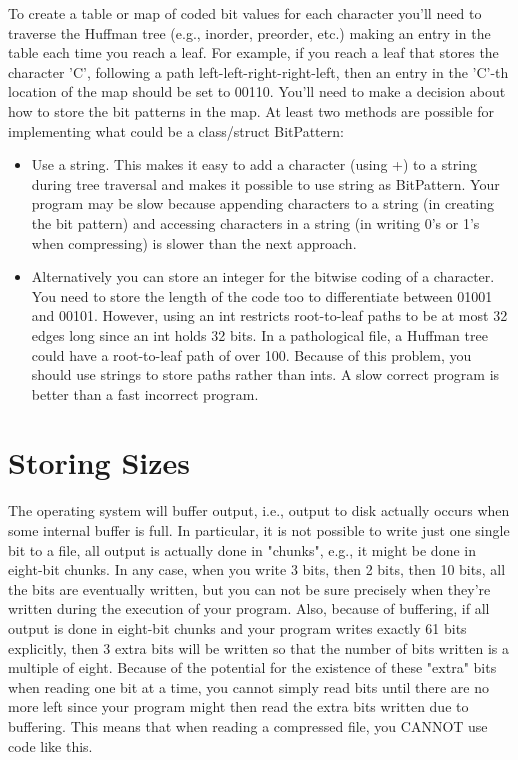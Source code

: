 \documentclass[12pt]{report}
\begin{document}
To create a table or map of coded bit values for each character you'll need to traverse the Huffman tree (e.g., inorder, preorder, etc.) making an entry in the table each time you reach a leaf. For example, if you reach a leaf that stores the character 'C', following a path left-left-right-right-left, then an entry in the 'C'-th location of the map should be set to 00110. You'll need to make a decision about how to store the bit patterns in the map. At least two methods are possible for implementing what could be a class/struct BitPattern: 

\begin{itemize}

\item    Use a string. This makes it easy to add a character (using +) to a string during tree traversal and makes it possible to use string as BitPattern. Your program may be slow because appending characters to a string (in creating the bit pattern) and accessing characters in a string (in writing 0's or 1's when compressing) is slower than the next approach.

\item    Alternatively you can store an integer for the bitwise coding of a character. You need to store the length of the code too to differentiate between 01001 and 00101. However, using an int restricts root-to-leaf paths to be at most 32 edges long since an int holds 32 bits. In a pathological file, a Huffman tree could have a root-to-leaf path of over 100. Because of this problem, you should use strings to store paths rather than ints. A slow correct program is better than a fast incorrect program. 

\end{itemize}

\section{Storing Sizes}

The operating system will buffer output, i.e., output to disk actually occurs when some internal buffer is full. In particular, it is not possible to write just one single bit to a file, all output is actually done in "chunks", e.g., it might be done in eight-bit chunks. In any case, when you write 3 bits, then 2 bits, then 10 bits, all the bits are eventually written, but you can not be sure precisely when they're written during the execution of your program. Also, because of buffering, if all output is done in eight-bit chunks and your program writes exactly 61 bits explicitly, then 3 extra bits will be written so that the number of bits written is a multiple of eight. Because of the potential for the existence of these "extra" bits when reading one bit at a time, you cannot simply read bits until there are no more left since your program might then read the extra bits written due to buffering. This means that when reading a compressed file, you CANNOT use code like this.
\end{document}
